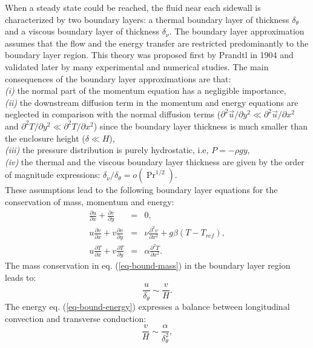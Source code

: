 When a steady state could be reached, the fluid near each sidewall is characterized by two boundary layers: a thermal boundary layer of thickness $\delta_{\theta}$ and a viscous boundary layer of thickness $\delta_\nu$.
The boundary layer approximation assumes that the flow and the energy transfer are restricted predominantly to the boundary layer region.
This theory was proposed first by Prandtl in 1904 and validated later by many experimental and numerical studies.
The main consequences of the boundary layer approximations are that: \\
{\it (i)} the normal part of the momentum equation has a negligible importance, \\
{\it (ii)} the downstream diffusion term in the momentum and energy equations are neglected in comparison with the normal diffusion terms ($\partial^2 \vec{u}/\partial y^2 \ll \partial^2 \vec{u}/\partial x^2$ and $\partial^2 T/\partial y^2 \ll \partial^2 T/\partial x^2$) since the boundary layer thickness is much smaller than the enclosure height ($ \delta \ll H$), \\
{\it (iii)} the pressure distribution is purely hydrostatic, i.e, $P = - \rho g y$, \\
{\it (iv)} the thermal and the viscous boundary layer thickness are given by the order of magnitude expressions: $\delta_\nu/\delta_\theta = o \left(\Pr^{1/2} \right)$.\\
These assumptions lead to the following boundary layer equations for the conservation of mass, momentum and energy:
\begin{eqnarray} \label{eq-bound-mass}
	\frac{\partial u}{\partial x} + \frac{\partial v}{\partial y} &=& 0, \\  \label{eq-bound-mom}
	u \frac{\partial v}{\partial x} + v \frac{\partial v}{\partial y} &=& \nu \frac{\partial^2 v}{\partial x^2} + g \beta (T - T_{ref}), \\ \label{eq-bound-energy}
	u \frac{\partial T}{\partial x} + v \frac{\partial T}{\partial y} &=& \alpha \frac{\partial^2 T}{\partial x^2}. 
\end{eqnarray}
The mass conservation in eq. (\ref{eq-bound-mass}) in the boundary layer region leads to:
\begin{equation}
	\frac{u}{\delta_\theta} \sim \frac{v}{H}.
\end{equation}
The energy eq. (\ref{eq-bound-energy}) expresses a balance between longitudinal convection and transverse conduction:
\begin{equation}
	\frac{v}{H} \sim \frac{\alpha}{\delta_\theta^2},
\end{equation}
